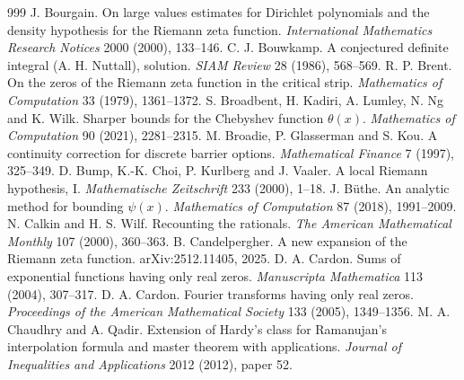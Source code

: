 \begin{thebibliography}{999}
 J. Bourgain. On large values estimates for Dirichlet polynomials and the density hypothesis for the Riemann zeta function. \emph{International Mathematics Research Notices} 2000 (2000), 133--146.
 C. J. Bouwkamp. A conjectured definite integral (A. H. Nuttall), solution. \emph{SIAM Review} 28 (1986), 568--569.
 R. P. Brent. On the zeros of the Riemann zeta function in the critical strip. \emph{Mathematics of Computation} 33 (1979), 1361--1372.
 S. Broadbent, H. Kadiri, A. Lumley, N. Ng and K. Wilk. Sharper bounds for the Chebyshev function $\theta(x)$. \emph{Mathematics of Computation} 90 (2021), 2281--2315.
 M. Broadie, P. Glasserman and S. Kou. A continuity correction for discrete barrier options. \emph{Mathematical Finance} 7 (1997), 325--349.
 D. Bump, K.-K. Choi, P. Kurlberg and J. Vaaler. A local Riemann hypothesis, I. \emph{Mathematische Zeitschrift} 233 (2000), 1--18.
 J. B\"uthe. An analytic method for bounding $\psi(x)$. \emph{Mathematics of Computation} 87 (2018), 1991--2009.
 N. Calkin and H. S. Wilf. Recounting the rationals. \emph{The American Mathematical Monthly} 107 (2000), 360--363.
 B. Candelpergher. A new expansion of the Riemann zeta function. arXiv:2512.11405, 2025.
 D. A. Cardon. Sums of exponential functions having only real zeros. \emph{Manuscripta Mathematica} 113 (2004), 307--317.
 D. A. Cardon. Fourier transforms having only real zeros. \emph{Proceedings of the American Mathematical Society} 133 (2005), 1349--1356.
 M. A. Chaudhry and A. Qadir. Extension of Hardy's class for Ramanujan's interpolation formula and master theorem with applications. \emph{Journal of Inequalities and Applications} 2012 (2012), paper 52.

\end{thebibliography}
